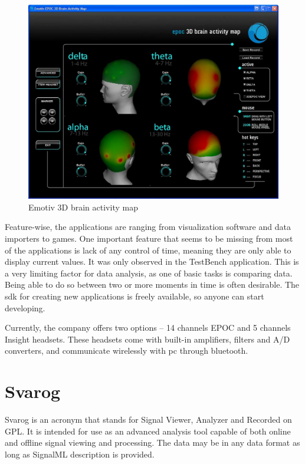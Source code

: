 \begin{figure}[htbp]
	\centering
	\includegraphics[width=0.8\linewidth]{fig/epoc3d.jpg}
	\caption[Caption for LOF]{Emotiv 3D brain activity map\protect\footnotemark}
	\label{fig:emotiv3d}
\end{figure}

Feature-wise, the applications are ranging from visualization software and data
importers to games. One important feature that seems to be missing from most of
the applications is lack of any control of time, meaning they are only able to
display current values. It was only observed in the TestBench application. This is a very limiting factor for data analysis, as one of
basic tasks is comparing data. Being able to do so between two or more
moments in time is often desirable. The \gls{sdk} for creating new applications
is freely available, so anyone can start developing.

Currently, the company offers two options -- 14 channels EPOC and 5 channels Insight
headsets. These headsets come with built-in amplifiers, filters and A/D
converters, and communicate wirelessly with \gls{pc} through bluetooth.

\section{Svarog}
Svarog is an acronym that stands for Signal Viewer, Analyzer and Recorded on GPL. 
It is intended for use as an advanced analysis tool capable
of both online and offline signal viewing and processing. The data may be in any
data format as long as SignalML description is provided.

